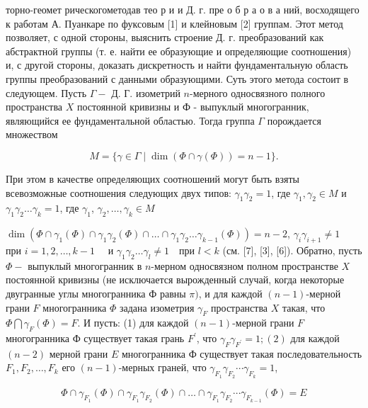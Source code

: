 \documentclass[10pt]{article}
\begin{document}
торно-геомет рическогометодав тео р и и Д. г. пре о б р а $о$ в а ний, восходящего к работам А. Пуанкаре по фуксовым [1] и клейновым [2] группам. Этот метод позволяет, с одной стороны, выяснить строение Д. г. преобразований как абстрактной группы (т. е. найти ее образующие и определяющие соотношения) и, с другой стороны, доказать дискретность и найти фундаментальную область группы преобразований с данными образующими. Суть этого метода состоит в следующем. Пусть $\Gamma-$ Д. Г. изометрий $n$-мерного односвязного полного пространства $X$ постоянной кривизны и Ф - выпуклый многогранник, являющийся ее фундаментальной областью. Тогда группа $\Gamma$ порождается множеством



\[

M=\{\gamma \in \Gamma \mid \operatorname{dim}(\Phi \cap \gamma(\Phi))=n-1\} .

\]



При этом в качестве определяющих соотношений могут быть взяты всевозможные соотношения следующих двух типов: $\gamma_{1} \gamma_{2}=1$, где $\gamma_{1}, \gamma_{2} \in M$ и $\gamma_{1} \gamma_{2} \ldots \gamma_{k}=1$, где $\gamma_{1}$, $\gamma_{2}, \ldots, \gamma_{k} \in M$



$\operatorname{dim}\left(\Phi \cap \gamma_{1}(\Phi) \cap \gamma_{1} \gamma_{2}(\Phi) \cap \ldots \cap \gamma_{1} \gamma_{2} \ldots \gamma_{k-1}(\Phi)\right)=n-2$, $\gamma_{i} \gamma_{i+1} \neq 1 \quad$ при $i=1,2, \ldots, k-1 \quad$ и $\gamma_{1} \gamma_{2} \ldots \gamma_{l} \neq 1 \quad п р и$ $l<k$ (см. [7], [3], [6]). Обратно, пусть $\Phi-$ выпуклый многогранник в $n$-мерном односвязном полном пространстве $X$ постоянной кривизны (не исключается вырожденный случай, когда некоторые двугранные углы многогранника Ф равны $\pi)$, и для каждой $(n-1)$-мерной грани $F$ многогранника $\Phi$ задана изометрия $\gamma_{F}$ пространства $X$ такая, что $\Phi \bigcap \gamma_{F}(\Phi)=F$. И пусть: (1) для каждой $(n-1)$-мерной грани $F$ многогранника Ф существует такая грань $F^{\prime}$, что $\gamma_{F} \gamma_{F^{\prime}}=1 ;(2)$ для каждой $(n-2)$ мерной грани $E$ многогранника Ф существует такая последовательность $F_{1}, F_{2}, \ldots, F_{k}$ его $(n-1)$-мерных граней, что $\gamma_{F_{1}} \gamma_{F_{2}} \cdots \gamma_{F_{k}}=1$,



\[

\Phi \cap \gamma_{F_{1}}(\Phi) \cap \gamma_{F_{1}} \gamma_{F_{2}}(\Phi) \cap \ldots \cap \gamma_{F_{1}} \gamma_{F_{2}} \cdots \gamma_{F_{k-1}}(\Phi)=E

\]
\end{document}
